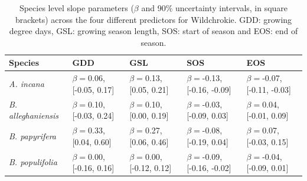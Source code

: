 \documentclass{article}\usepackage[]{graphicx}\usepackage[]{xcolor}
\begin{document}
% 

\begin{table}[ht]
\centering
\begin{tabular}{lllll}
  \hline
Species & GDD & GSL & SOS & EOS \\ 
  \hline
\textit{A. incana} & $\beta = $0.06, [-0.05, 0.17] & $\beta = $0.13, [0.05, 0.21] & $\beta = $-0.13, [-0.16, -0.09] & $\beta = $-0.07, [-0.11, -0.03] \\ 
  \textit{B. alleghaniensis} & $\beta = $0.10, [-0.03, 0.24] & $\beta = $0.10, [0.00, 0.19] & $\beta = $-0.03, [-0.09, 0.03] & $\beta = $0.04, [-0.01, 0.09] \\ 
  \textit{B. papyrifera} & $\beta = $0.33, [0.04, 0.60] & $\beta = $0.27, [0.06, 0.46] & $\beta = $-0.08, [-0.19, 0.04] & $\beta = $0.07, [-0.03, 0.15] \\ 
  \textit{B. populifolia} & $\beta = $0.00, [-0.16, 0.16] & $\beta = $0.00, [-0.12, 0.12] & $\beta = $-0.09, [-0.16, -0.02] & $\beta = $-0.04, [-0.09, 0.01] \\ 
   \hline
\end{tabular}
\caption{Species level slope parameters ($\beta$ and 90\% uncertainty intervals, in square brackets) across the four different predictors for Wildchrokie. GDD: growing degree days, GSL: growing season length, SOS: start of season and EOS: end of season.} 
\label{tab:wc_slope_table}
\end{table}
\end{document}
